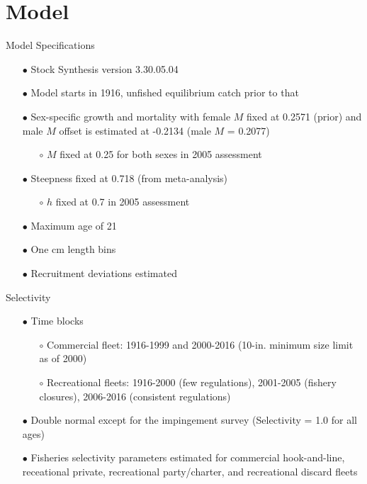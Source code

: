 \documentclass[ignorenonframetext,]{beamer}
\begin{document}
\section{Model}\label{model}

\begin{frame}{Model Specifications}

\begin{itemize}
\item[$\bullet$] Stock Synthesis version 3.30.05.04
\item[$\bullet$] Model starts in 1916, unfished equilibrium catch prior to that
\item[$\bullet$] Sex-specific growth and mortality with female $M$ fixed at 0.2571 (prior) and male $M$ offset is estimated at -0.2134 (male $M$ = 0.2077)
\begin{itemize}
\item[$\circ$] $M$ fixed at 0.25 for both sexes in 2005 assessment
\end{itemize}
\item[$\bullet$] Steepness fixed at 0.718 (from meta-analysis)
\begin{itemize}
\item[$\circ$] $h$ fixed at 0.7 in 2005 assessment
\end{itemize}
\item[$\bullet$] Maximum age of 21
\item[$\bullet$] One cm length bins
\item[$\bullet$] Recruitment deviations estimated
\end{itemize}

\end{frame}

\begin{frame}{Selectivity}

\begin{itemize}
\item[$\bullet$] Time blocks
\begin{itemize}
\item[$\circ$] Commercial fleet: 1916-1999 and 2000-2016 (10-in. minimum size limit as of 2000)
\item[$\circ$] Recreational fleets: 1916-2000 (few regulations), 2001-2005 (fishery closures), 2006-2016 (consistent regulations)
\end{itemize}
\item[$\bullet$] Double normal except for the impingement survey (Selectivity = 1.0 for all ages)
\item[$\bullet$] Fisheries selectivity parameters estimated for commercial hook-and-line, receational private, recreational party/charter, and recreational discard fleets
\end{itemize}

\end{frame}
\end{document}
